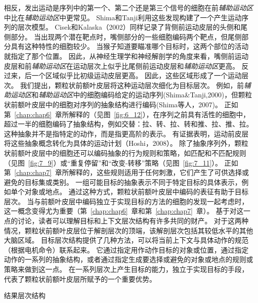 相反，发出运动是序列中的第一个、第二个还是第三个信号的细胞在前\textit{辅助运动区}中比在\textit{辅助运动区}中更常见。
Shima和Tanji利用这些发现构建了一个产生运动序列的层次模型。
Cisek和Kalaska（2002）同样记录了背侧前运动皮层的头侧和尾侧部分。
当出现两个潜在靶点时，嘴侧部分的一些细胞编码两个靶点，但尾侧部分具有这种特性的细胞较少。
当猴子知道要瞄准哪个目标时，这两个部位的活动就指定了那个位置。
因此，从神经生理学和神经解剖学的角度来看，嘴侧前运动皮层和前\textit{辅助运动区}在运动层次上似乎比尾侧前运动皮层和\textit{辅助运动区}更高。
反过来，后一个区域似乎比初级运动皮层更高。
因此，这些区域形成了一个运动层次。
我们提出，颗粒状前额叶皮层将这种运动层次细化为目标层次。
例如，前\textit{辅助运动区}和\textit{辅助运动区}中的细胞编码给定的运动序列(Shima\&Tanji,2000)，但颗粒状前额叶皮层中的细胞对序列的抽象结构进行编码(Shima等人，2007)。
正如第~\ref{chap:chap6}~章所解释的（见图~\ref{fig:6_12}），在序列之前具有活性的细胞中，超过一半的细胞编码了抽象结构，例如交替：拉、转、拉、转和推、拉、推、拉。
这种抽象并不是指特定的动作，而是指更高阶的表示。
有证据表明，运动前皮层将这些抽象概念转化为具体的运动计划（Hoshi，2008）。
除了抽象序列外，颗粒状前额叶皮层中的细胞还可以编码抽象的行为规则和策略，如匹配和不匹配规则（见图~\ref{fig:7_9}）或“重复停留”和“改变-转移”策略（见图~\ref{fig:7_11}）。
正如第~\ref{chap:chap7}~章所解释的，这些规则适用于任何刺激，它们产生了可供选择或避免的目标集或类别。
一组可能目标的抽象表示不同于特定目标的具体表示，例如单个对象或地点。
通过这种方式，颗粒状前额叶皮层中编码的表征有助于目标层次。
当与前额叶皮层中编码独立于实现目标的方法的细胞的发现一起考虑时，这一概念变得尤为重要（第~\ref{chap:chap6}~章和第~\ref{chap:chap7}~章）。
基于对这一点的讨论，读者可以理解目标和上下文层次结构有许多共同的财产。
对于这两种情况，颗粒状前额叶皮层位于解剖层次的顶端，该解剖层次包括其较低水平的其他大脑区域。
目标层次结构提供了几种方法，可以将当前上下文与具体动作的规范（根据电机命令）联系起来。
它通过指定用作动作目标的对象或位置，通过指定动作的一系列的抽象结构，或者通过指定生成要选择或避免的对象或地点的规则或策略来做到这一点。
在一系列层次上产生目标的能力，独立于实现目标的手段，代表了颗粒状前额叶皮层所赋予的一个重要优势。



结果层次结构

